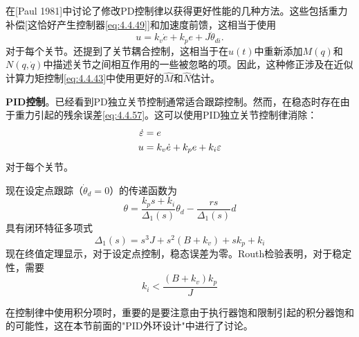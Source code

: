 \documentclass[UTF8]{ctexart}
\theoremstyle{definition}
\begin{document}
在[Paul 1981]中讨论了修改PD控制律以获得更好性能的几种方法。这些包括重力补偿[这恰好产生控制器\eqref{eq:4.4.49}]和加速度前馈，这相当于使用
\begin{equation}\label{eq:4.4.58}
    u = k_v\dot{e} + k_pe + J\ddot{\theta}_{di}.
\end{equation}
对于每个关节。还提到了关节耦合控制，这相当于在$u(t)$中重新添加$M(q)$和$N(q, \dot{q})$中描述关节之间相互作用的一些被忽略的项。因此，这种修正涉及在近似计算力矩控制\eqref{eq:4.4.43}中使用更好的$\hat{M}$和$\hat{N}$估计。

\textbf{PID控制}。已经看到PD独立关节控制通常适合跟踪控制。然而，在稳态时存在由于重力引起的残余误差\eqref{eq:4.4.57}。这可以使用PID独立关节控制律消除：
\begin{align}
    \dot{\varepsilon} &= e \notag \\
    u &= k_v\dot{e} + k_pe + k_i\varepsilon \label{eq:4.4.59}
\end{align}
对于每个关节。

现在设定点跟踪（$\dot{\theta}_d = 0$）的传递函数为
\begin{equation}\label{eq:4.4.60}
    \theta = \frac{k_ps + k_i}{\Delta_1(s)}\theta_d - \frac{rs}{\Delta_1(s)}d
\end{equation}
具有闭环特征多项式
\begin{equation}\label{eq:4.4.61}
    \Delta_1(s) = s^3 J + s^2(B + k_v) + sk_p + k_i
\end{equation}
现在终值定理显示，对于设定点控制，稳态误差为零。Routh检验表明，对于稳定性，需要
\begin{equation}\label{eq:4.4.62}
    k_i < \frac{(B + k_v)k_p}{J}
\end{equation}

在控制律中使用积分项时，重要的是要注意由于执行器饱和限制引起的积分器饱和的可能性，这在本节前面的"PID外环设计"中进行了讨论。
\end{document}

